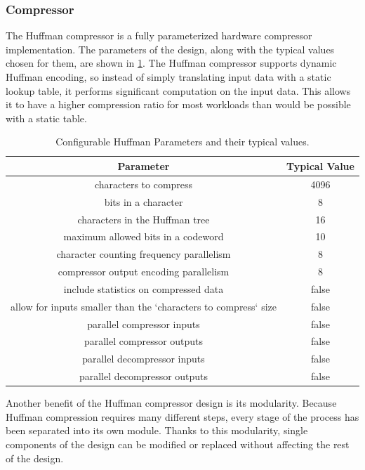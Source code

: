 \documentclass[doublespace,nopageskip]{VTthesis}
\begin{document}
\subsubsection{Compressor}\label{sss:huffman_compressor_design}
The Huffman compressor is a fully parameterized hardware compressor implementation. The parameters of the design, along with the typical values chosen for them, are shown in \ref{tab:huffman-configuration-table}. The Huffman compressor supports dynamic Huffman encoding, so instead of simply translating input data with a static lookup table, it performs significant computation on the input data. This allows it to have a higher compression ratio for most workloads than would be possible with a static table.

\begin{table}[htb]
	\centering
	\caption{Configurable Huffman Parameters and their typical values.}
	\begin{tabular}{cc}
	    \toprule
	    Parameter & Typical Value \\
	    \midrule
	    characters to compress & 4096 \\
	    \midrule
	    bits in a character & 8 \\
	    \midrule
	    characters in the Huffman tree & 16 \\
	    \midrule
	    maximum allowed bits in a codeword & 10 \\
	    \midrule
	    character counting frequency parallelism & 8 \\
	    \midrule
	    compressor output encoding parallelism & 8 \\
	    \midrule
	    include statistics on compressed data & false \\
	    \midrule
	    allow for inputs smaller than the `characters to compress` size & false \\
	    \midrule
	    parallel compressor inputs & false \\
	    \midrule
	    parallel compressor outputs & false \\
	    \midrule
	    parallel decompressor inputs & false \\ 
	    \midrule
	    parallel decompressor outputs & false \\
	    \bottomrule
	\end{tabular}
	\label{tab:huffman-configuration-table}
\end{table}

Another benefit of the Huffman compressor design is its modularity. Because Huffman compression requires many different steps, every stage of the process has been separated into its own module. Thanks to this modularity, single components of the design can be modified or replaced without affecting the rest of the design.
\end{document}
